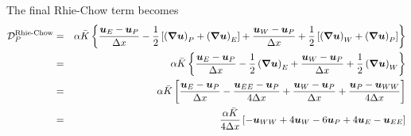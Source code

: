 \documentclass[sn-mathphys,Numbered]{sn-jnl}%
\newcommand{\bb}{\boldsymbol}
\begin{document}
\begin{appendices}
The final Rhie-Chow term becomes
\begin{eqnarray} \label{eq:Rhie_Chow_1D}
	\mathcal{D}_P^{\text {Rhie-Chow}}
	&=& 
	\alpha \bar{K}
		\left\{
		\frac{ \bb{u}_{E} - \bb{u}_P}{\Delta x}
		- \frac{1}{2} \left[ \left(\bb{\nabla} \bb{u} \right)_P + \left(\bb{\nabla} \bb{u} \right)_E \right]
	+ \frac{ \bb{u}_{W} - \bb{u}_P}{\Delta x}
		+ \frac{1}{2} \left[ \left(\bb{\nabla} \bb{u} \right)_W + \left(\bb{\nabla} \bb{u} \right)_P \right]
		\right\}
	\notag \\
	&=& 
	\alpha \bar{K}
		\left\{
		\frac{ \bb{u}_{E} - \bb{u}_P}{\Delta x}
		- \frac{1}{2} \left(\bb{\nabla} \bb{u} \right)_E
	+ \frac{ \bb{u}_{W} - \bb{u}_P}{\Delta x}
		+ \frac{1}{2} \left(\bb{\nabla} \bb{u} \right)_W 
		\right\}
	\notag \\
	&=& 
	\alpha \bar{K}
		\left[
		\frac{ \bb{u}_{E} - \bb{u}_P}{\Delta x}
		- \frac{\bb{u}_{EE} - \bb{u}_{P}}{4\Delta x}
	+ \frac{ \bb{u}_{W} - \bb{u}_P}{\Delta x}
		+ \frac{\bb{u}_{P} - \bb{u}_{WW}}{4\Delta x} 
		\right]
	\notag \\
	&=& 
	\frac{\alpha \bar{K}}{4 \Delta x}	\left[- \bb{u}_{WW} + 4\bb{u}_W - 6\bb{u}_P + 4\bb{u}_{E} - \bb{u}_{EE} \right]
\end{eqnarray}


\end{appendices}
\end{document}
